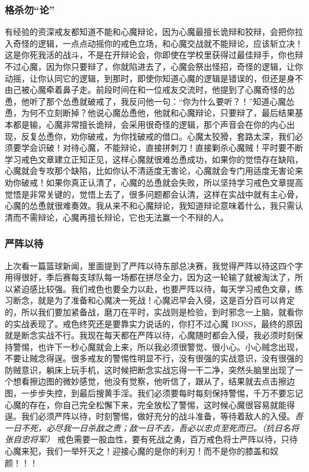 \subsubsection{格杀勿“论”}

有经验的资深戒友都知道不能和心魔辩论，因为心魔最擅长诡辩和狡辩，会把你拉入奇怪的逻辑，一点点动摇你的戒色立场，和心魔交战就不能辩论，应该斩立决！这是你死我活的战斗，不是在开辩论会，你即使在学校里获得过最佳辩手，你也辩不过心魔，因为你只要辩了，你就陷进去了，心魔会祭出怪招，奇怪的逻辑，让你动摇，让你认同它的逻辑，到那时，即使你知道心魔的逻辑是错误的，但还是身不由己被心魔牵着鼻子走。前段时间在和一位戒友交流时，他提到了心魔奇怪的怂恿，他听了那个怂恿就破戒了，我反问他一句：“你为什么要听？！”知道心魔怂恿，为何不立刻断掉？他说心魔怂恿他，他就和心魔辩论，只要辩了，最后结果基本都是输，心魔非常擅长诡辩，会采用很奇怪的逻辑，那个声音会在你的内心出现，反复怂恿你，劝你破戒，为你找破戒的借口。心魔太狡猾，套路太深，我们必须要学会识破！对待心魔，不能辩论，直接拼刺刀！直接剿杀心魔贼！平时要不断学习戒色文章建立正知正见，这样心魔就很难怂恿成功，如果你的觉悟存在缺陷，心魔就会专攻那个缺陷，比如你认不清适度无害论，心魔就会专门用适度无害论来劝你破戒！如果你真正认清了，心魔的怂恿就会失败，所以坚持学习戒色文章提高觉悟是非常关键的，觉悟上去了，很多问题都会认清，这样在实战中就有主心骨，心魔的怂恿就很难奏效。我从来不和心魔辩论，我知道辩论意味着什么，我只需认清而不需辩论，心魔再擅长辩论，它也无法赢一个不辩的人。

\subsubsection{严阵以待}

上次看一篇篮球新闻，里面提到了严阵以待东部总决赛，我觉得严阵以待这四个字用得很好，季后赛每支球队每一场都在拼尽全力，因为这一轮输了就被淘汰了，所以紧迫感比较强。我们戒色也要全力以赴，也要严阵以待，每天学习戒色文章，练习断念，就是为了准备和心魔决一死战！心魔迟早会入侵，这是百分百可以肯定的，所以我们要加紧备战，磨刀在平时，实战则是检验，到时邪念一上脑，就看你的实战表现了。戒色终究还是要靠实力说话的，你打不过心魔 BOSS，最终的原因就是断念实战不行。我现在每天都在严阵以待，心魔随时都会入侵，我必须时刻保持警惕，也许下一秒心魔就会上来，所以我必须很警觉、很小心。小心贼念出现，不要让贼念得逞。很多戒友的警惕性明显不行，没有很强的实战意识，没有很强的防贼意识，躺床上玩手机，这时候把断念实战忘得一干二净，突然头脑里出现了一个想看擦边图的微妙感觉，他没有觉察，他听信了，跟从了，结果就去点击擦边图，一步步失控，到最后搜黄手淫。我们必须要每时每刻保持警惕，千万不要忘记心魔的存在，你自己完全松懈下来，完全放松了警惕，这时候心魔很容易就能得逞。我们必须严阵以待，时刻警惕，做好充分的战斗准备，等待着敌人的入侵。\textit{吾一日不死，必尽我一日杀敌之责；敌一日不去，吾必以忠贞至死而已。（抗日名将张自忠将军）} 戒色需要一股血性，要有死战之勇，百万戒色将士严阵以待，只待心魔来犯，我们一举歼灭之！迎接心魔的是你的利刃！而不是你的膝盖和奴颜！！！

